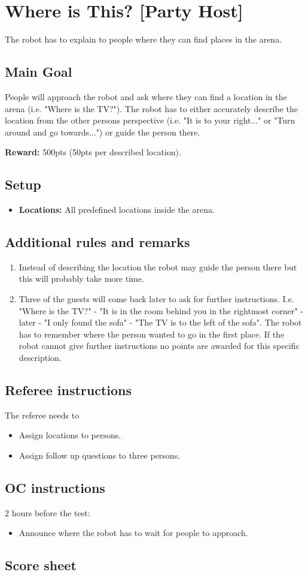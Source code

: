 \section{Where is This? [Party Host]}
The robot has to explain to people where they can find places in the arena.


\subsection{Main Goal}
People will approach the robot and ask where they can find a location in the arena (i.e. "Where is the TV?"). The robot has to either accurately describe the location from the other persons perspective (i.e. "It is to your right..." or "Turn around and go towards...") or guide the person there.

\noindent\textbf{Reward:} 500pts (50pts per described location).

\subsection{Setup}
\begin{itemize}[nosep]
	\item \textbf{Locations:} All predefined locations inside the arena.
\end{itemize}

\subsection{Additional rules and remarks}
\begin{enumerate}[nosep]
	 \item Instead of describing the location the robot may guide the person there but this will probably take more time.
	 \item Three of the guests will come back later to ask for further instructions. I.e. "Where is the TV?" - "It is in the room behind you in the rightmost corner" - later - "I only found the sofa" - "The TV is to the left of the sofa". The robot has to remember where the person wanted to go in the first place. If the robot cannot give further instructions no points are awarded for this specific description.
\end{enumerate}

\subsection{Referee instructions}
The referee needs to
\begin{itemize}
	\item Assign locations to persons.
	\item Assign follow up questions to three persons.
\end{itemize}

\subsection{OC instructions}
2 hours before the test:
\begin{itemize}
	\item Announce where the robot has to wait for people to approach.
\end{itemize}

\newpage
\subsection{Score sheet}
